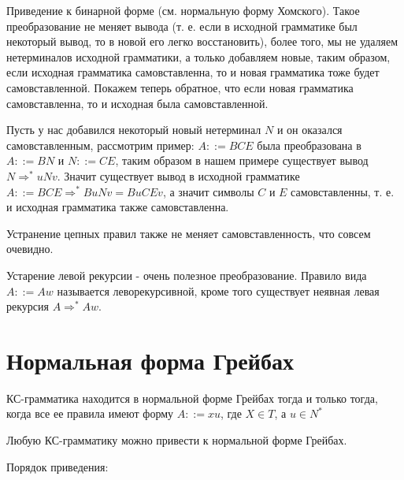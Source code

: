 Приведение к бинарной форме (см. нормальную форму Хомского). Такое преобразование не меняет вывода (т. е. если в исходной грамматике был некоторый вывод, то в новой
его легко восстановить), более того, мы не удаляем нетерминалов исходной грамматики, а только добавляем новые, таким образом, если исходная грамматика самовставленна,
то и новая грамматика тоже будет самовставленной. Покажем теперь обратное, что если новая грамматика самовставленна, то и исходная была самовставленной.

Пусть у нас добавился некоторый новый нетерминал $N$ и он оказался самовставленным, рассмотрим пример: $A ::= BCE$ была преобразована в $A ::= BN$ и $N ::= CE$, таким
образом в нашем примере существует вывод $N \Rightarrow^{*} uNv$. Значит существует вывод в исходной грамматике $A ::= BCE \Rightarrow^{*} BuNv = BuCEv$, а значит
символы $C$ и $E$ самовставленны, т. е. и исходная грамматика также самовставленна.

Устранение цепных правил также не меняет самовставленность, что совсем очевидно.

Устарение левой рекурсии - очень полезное преобразование. Правило вида $A ::= Aw$ называется леворекурсивной, кроме того существует неявная левая рекурсия
$A \Rightarrow^{*} Aw$.

\section{Нормальная форма Грейбах}

\begin{Def}
КС-грамматика находится в нормальной форме Грейбах тогда и только тогда, когда все ее правила имеют форму $A ::= xu$, где $X \in T$, а $u \in N^{*}$
\end{Def}

Любую КС-грамматику можно привести к нормальной форме Грейбах.

Порядок приведения:

